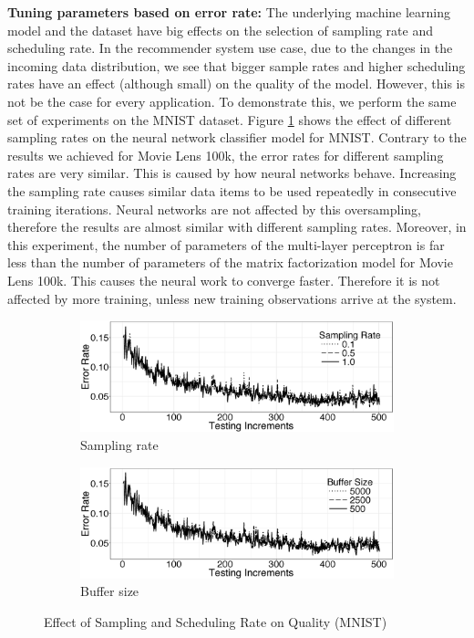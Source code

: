 \textbf{Tuning parameters based on error rate:} The underlying machine learning model and the dataset have big effects on the selection of sampling rate and scheduling rate.
In the recommender system use case, due to the changes in the incoming data distribution, we see that bigger sample rates and higher scheduling rates have an effect (although small) on the quality of the model.
However, this is not be the case for every application.
To demonstrate this, we perform the same set of experiments on the MNIST dataset.
Figure \ref{fig:mnist-sample-rate} shows the effect of different sampling rates on the neural network classifier model for MNIST.
Contrary to the results we achieved for Movie Lens 100k, the error rates for different sampling rates are very similar.
This is caused by how neural networks behave.
Increasing the sampling rate causes similar data items to be used repeatedly in consecutive training iterations.
Neural networks are not affected by this oversampling, therefore the results are almost similar with different sampling rates.
Moreover, in this experiment, the number of parameters of the multi-layer perceptron is far less than the number of parameters of the matrix factorization model for Movie Lens 100k.
This causes the neural work to converge faster.
Therefore it is not affected by more training, unless new training observations arrive at the system.

\begin{figure}[h]
\begin{subfigure}{\columnwidth}
\centering
\includegraphics[width=\columnwidth]{../images/experiment-results/mnist-sampling-improved.eps}
\caption{Sampling rate}
\label{fig:mnist-sample-rate}
\end{subfigure}
\begin{subfigure}{\columnwidth}
\centering
\includegraphics[width=\columnwidth]{../images/experiment-results/mnist-buffersize-improved.eps}
\caption{Buffer size}
\label{fig:mnist-buffer-size}
\end{subfigure}
\vspace{2mm}
\caption{Effect of Sampling and Scheduling Rate on Quality (MNIST)}
\end{figure}

